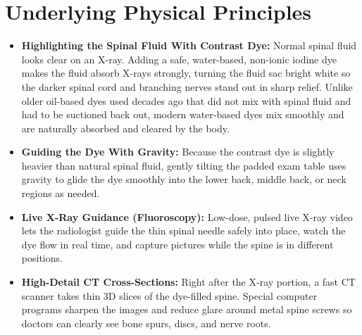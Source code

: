 \section{Underlying Physical Principles}
\begin{itemize}
    \item \textbf{Highlighting the Spinal Fluid With Contrast Dye:} Normal spinal fluid looks clear on an X-ray. Adding a safe, water-based, non-ionic iodine dye makes the fluid absorb X-rays strongly, turning the fluid sac bright white so the darker spinal cord and branching nerves stand out in sharp relief. Unlike older oil-based dyes used decades ago that did not mix with spinal fluid and had to be suctioned back out, modern water-based dyes mix smoothly and are naturally absorbed and cleared by the body.
    \item \textbf{Guiding the Dye With Gravity:} Because the contrast dye is slightly heavier than natural spinal fluid, gently tilting the padded exam table uses gravity to glide the dye smoothly into the lower back, middle back, or neck regions as needed.
    \item \textbf{Live X-Ray Guidance (Fluoroscopy):} Low-dose, pulsed live X-ray video lets the radiologist guide the thin spinal needle safely into place, watch the dye flow in real time, and capture pictures while the spine is in different positions.
    \item \textbf{High-Detail CT Cross-Sections:} Right after the X-ray portion, a fast CT scanner takes thin 3D slices of the dye-filled spine. Special computer programs sharpen the images and reduce glare around metal spine screws so doctors can clearly see bone spurs, discs, and nerve roots.
\end{itemize}


